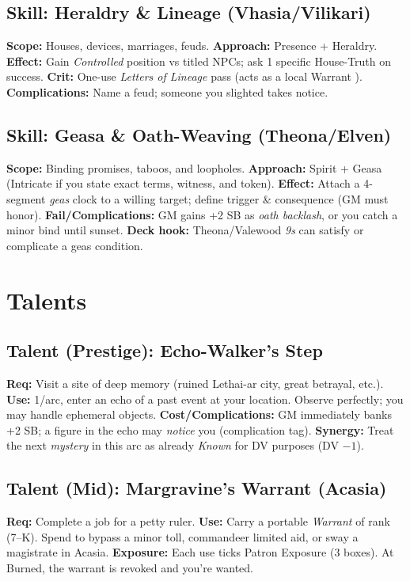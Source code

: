 \subsection{Skill: Heraldry \& Lineage (Vhasia/Vilikari)}
\textbf{Scope:} Houses, devices, marriages, feuds.
\textbf{Approach:} Presence + Heraldry.
\textbf{Effect:} Gain \emph{Controlled} position vs titled NPCs; ask 1 specific House-Truth on success.
\textbf{Crit:} One-use \emph{Letters of Lineage} pass (acts as a local Warrant \SuitDiamond{}).
\textbf{Complications:} Name a feud; someone you slighted takes notice.

\subsection{Skill: Geasa \& Oath-Weaving (Theona/Elven)}
\textbf{Scope:} Binding promises, taboos, and loopholes.
\textbf{Approach:} Spirit + Geasa (Intricate if you state exact terms, witness, and token).
\textbf{Effect:} Attach a 4-segment \emph{geas} clock to a willing target; define trigger \& consequence (GM must honor).
\textbf{Fail/Complications:} GM gains +2 SB as \emph{oath backlash}, or you catch a minor bind until sunset.
\textbf{Deck hook:} Theona/Valewood \emph{9s} can satisfy or complicate a geas condition.

\section{Talents}

\subsection{Talent (Prestige): Echo-Walker's Step}
\textbf{Req:} Visit a site of deep memory (ruined Lethai-ar city, great betrayal, etc.).
\textbf{Use:} 1/arc, enter an echo of a past event at your location. Observe perfectly; you may handle ephemeral objects.
\textbf{Cost/Complications:} GM immediately banks +2 SB; a figure in the echo may \emph{notice} you (complication tag).
\textbf{Synergy:} Treat the next \emph{mystery} \SuitClub{} in this arc as already \emph{Known} for DV purposes (DV $-1$).

\subsection{Talent (Mid): Margravine's Warrant (Acasia)}
\textbf{Req:} Complete a job for a petty ruler.
\textbf{Use:} Carry a portable \SuitDiamond{} \emph{Warrant} of rank (7--K). Spend to bypass a minor toll, commandeer limited aid, or sway a magistrate in Acasia.
\textbf{Exposure:} Each use ticks Patron Exposure (3 boxes). At Burned, the warrant is revoked and you're wanted.

